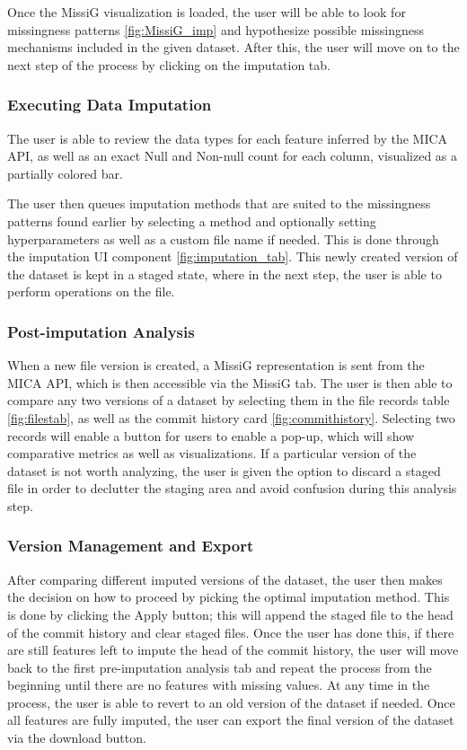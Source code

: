 \documentclass[a4paper, 11pt]{article}
\begin{document}
Once the MissiG visualization is loaded, the user will be able to look for
missingness patterns \cref{fig:MissiG_imp} and hypothesize possible missingness
mechanisms included in the given dataset. After this, the user will move on to
the next step of the process by clicking on the imputation tab. 

\subsubsection*{Executing Data Imputation} 
The user is able to review the data types for each feature inferred by the MICA
API, as well as an exact Null and Non-null count for each column, visualized as
a partially colored bar.

The user then queues imputation methods that are suited to the missingness
patterns found earlier by selecting a method and optionally setting
hyperparameters as well as a custom file name if needed. This is done through
the imputation UI component \cref{fig:imputation_tab}. This newly created
version of the dataset is kept in a staged state, where in the next step, the
user is able to perform operations on the file.

\subsubsection*{Post-imputation Analysis} 
When a new file version is created, a MissiG representation is sent from the
MICA API, which is then accessible via the MissiG tab. The user is then able to
compare any two versions of a dataset by selecting them in the file records
table \cref{fig:filestab}, as well as the commit history card
\cref{fig:commithistory}. Selecting two records will enable a button for users
to enable a pop-up, which will show comparative metrics as well as
visualizations. If a particular version of the dataset is not worth analyzing,
the user is given the option to discard a staged file in order to declutter the
staging area and avoid confusion during this analysis step.
        

\subsubsection*{Version Management and Export} 
After comparing different imputed versions of the dataset, the user then makes
the decision on how to proceed by picking the optimal imputation method. This
is done by clicking the Apply button; this will append the staged file to the
head of the commit history and clear staged files. Once the user has done this,
if there are still features left to impute the head of the commit history, the
user will move back to the first pre-imputation analysis tab and repeat the
process from the beginning until there are no features with missing values.
At any time in the process, the user is able to revert to an old version of the
dataset if needed. Once all features are fully imputed, the user can export the
final version of the dataset via the download button.
\end{document}
